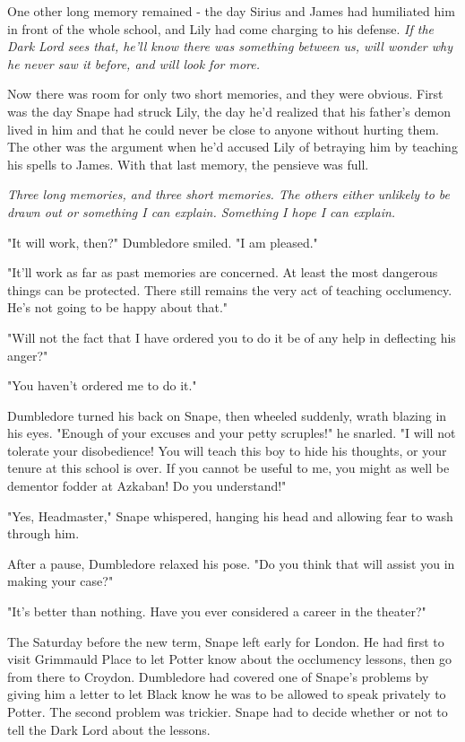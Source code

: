 One other long memory remained - the day Sirius and James had humiliated him in front of the whole school, and Lily had come charging to his defense. \emph{If the Dark Lord sees that, he'll know there was something between us, will wonder why he never saw it before, and will look for more.}

Now there was room for only two short memories, and they were obvious. First was the day Snape had struck Lily, the day he'd realized that his father's demon lived in him and that he could never be close to anyone without hurting them. The other was the argument when he'd accused Lily of betraying him by teaching his spells to James. With that last memory, the pensieve was full.

\emph{Three long memories, and three short memories. The others either unlikely to be drawn out or something I can explain. Something I hope I can explain.}

\sbreak

"It will work, then?" Dumbledore smiled. "I am pleased."

"It'll work as far as past memories are concerned. At least the most dangerous things can be protected. There still remains the very act of teaching occlumency. He's not going to be happy about that."

"Will not the fact that I have ordered you to do it be of any help in deflecting his anger?"

"You haven't ordered me to do it."

Dumbledore turned his back on Snape, then wheeled suddenly, wrath blazing in his eyes. "Enough of your excuses and your petty scruples!" he snarled. "I will not tolerate your disobedience! You will teach this boy to hide his thoughts, or your tenure at this school is over. If you cannot be useful to me, you might as well be dementor fodder at Azkaban! Do you understand!"

"Yes, Headmaster," Snape whispered, hanging his head and allowing fear to wash through him.

After a pause, Dumbledore relaxed his pose. "Do you think that will assist you in making your case?"

"It's better than nothing. Have you ever considered a career in the theater?"

The Saturday before the new term, Snape left early for London. He had first to visit Grimmauld Place to let Potter know about the occlumency lessons, then go from there to Croydon. Dumbledore had covered one of Snape's problems by giving him a letter to let Black know he was to be allowed to speak privately to Potter. The second problem was trickier. Snape had to decide whether or not to tell the Dark Lord about the lessons.

